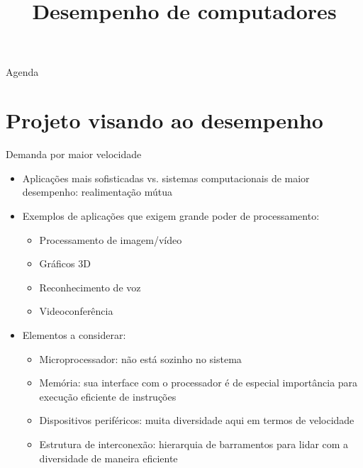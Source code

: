 



\title{\cursogrande\\ \vspace{1cm}Desempenho de computadores}


   \maketitle[randomdots={false}]
   
   \begin{slide}{Agenda}
      \tableofcontents[content=sections]
   \end{slide}
\section[slide=true]{Projeto visando ao desempenho}
\begin{slide}[toc=]{Demanda por maior velocidade}
	\begin{itemize}
		\item Aplicações mais sofisticadas vs. sistemas computacionais de maior desempenho: realimentação mútua\pause 
		\item Exemplos de aplicações que exigem grande poder de processamento:
			\begin{itemize}
				\item Processamento de imagem/vídeo
				\item Gráficos 3D
				\item Reconhecimento de voz
				\item Videoconferência\pause
			\end{itemize}
		\item Elementos a considerar:
			\begin{itemize}
				\item Microprocessador: não está sozinho no sistema\pause
				\item Memória: sua interface com o processador é de especial importância para execução eficiente de instruções\pause
				\item Dispositivos periféricos: muita diversidade aqui em termos de velocidade\pause
				\item Estrutura de interconexão: hierarquia de barramentos para lidar com a diversidade de maneira eficiente
			\end{itemize}
	\end{itemize}
\end{slide}


